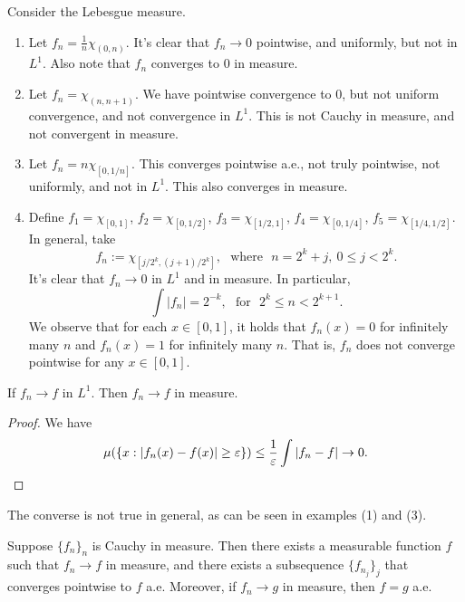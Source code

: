 \documentclass[12pt]{article} %
\begin{document}
\begin{example}
    Consider the Lebesgue measure. \begin{enumerate}
        \item Let $f_n = \frac{1}{n} \chi_{(0, n)}$. It's clear that $f_n \to 0$ pointwise, and uniformly, but not in $L^1$. Also note that $f_n$ converges to $0$ in measure. 
        \item Let $f_n = \chi_{(n, n+1)}$. We have pointwise convergence to $0$, but not uniform convergence, and not convergence in $L^1$. This is not Cauchy in measure, and not convergent in measure.
        \item Let $f_n = n \chi_{[0, 1/n]}$. This converges pointwise a.e., not truly pointwise, not uniformly, and not in $L^1$. This also converges in measure.
        \item Define $f_1 = \chi_{[0,1]}$, $f_2 = \chi_{[0,1/2]}$, $f_3 = \chi_{[1/2,1]}$, $f_4 = \chi_{[0,1/4]}$, $f_5 = \chi_{[1/4, 1/2]}$. In general, take \[f_n := \chi_{[j / 2^k, (j+1)/2^k]}, \ \ \ \text{where} \ \ \ n = 2^k + j, \ 0 \leq j < 2^k.\] It's clear that $f_n \to 0$ in $L^1$ and in measure. In particular, \[\int |f_n| = 2^{-k}, \ \ \ \text{for} \ \ \ 2^k \leq n < 2^{k+1}.\] We observe that for each $x \in [0,1]$, it holds that $f_n(x) = 0$ for infinitely many $n$ and $f_n(x) = 1$ for infinitely many $n$. That is, $f_n$ does not converge pointwise for any $x \in [0,1]$.
    \end{enumerate}
\end{example}

\begin{proposition}
    If $f_n \to f$ in $L^1$. Then $f_n \to f$ in measure. 
\end{proposition}

\begin{proof}
    We have \begin{align*}
        \mu(\{x : |f_n(x) - f(x)| \geq \varepsilon \}) \leq \frac{1}{\varepsilon} \int |f_n - f| \to 0.
    \end{align*}
\end{proof}

\begin{remark}
    The converse is not true in general, as can be seen in examples (1) and (3).
\end{remark}

\begin{theorem}
    Suppose $\{f_n\}_n$ is Cauchy in measure. Then there exists a measurable function $f$ such that $f_n \to f$ in measure, and there exists a subsequence $\{f_{n_j}\}_j$ that converges pointwise to $f$ a.e. Moreover, if $f_n \to g$ in measure, then $f = g$ a.e.
\end{theorem}
\end{document}
